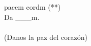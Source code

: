 \begin{cancion}%
	pacem cordm (**)\\
	Da ___m.\\
	\jump\\
(Danos la paz del corazón)\\
\end{cancion}%
